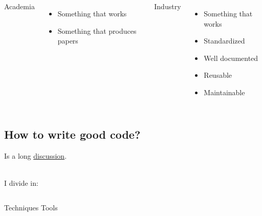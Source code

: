 \documentclass[usenames,dvipsnames]{beamer}
\theoremstyle{plain}
\theoremstyle{definition}
\begin{document}
\begin{frame}{\setframetitle{}}
    \begin{columns}[t]
      \centering
      Academia
      \begin{itemize}
      \item Something that works
      \item Something that produces papers
      \end{itemize}
      \color{my_raspberry}\Rightarrow
      \centering
      Industry
      \begin{itemize}
      \item Something that works
      \item Standardized
      \item Well documented
      \item Reusable
      \item Maintainable
      \end{itemize}
    \end{columns}
\end{frame}





\subsection{How to write good code?}

\begin{frame}{\setframetitle{}}
  {
   Is a long  \href{https://medium.com/@isaaclyman/steps-to-better-code-e6c3cce0c7f9}{\color{gray} discussion}. \vspace{1cm}

    \\
    I divide in: %
  \begin{columns}[t]
    \centering
    Techniques
    \centering
    Tools
  \end{columns}
}
\end{frame}
\end{document}
